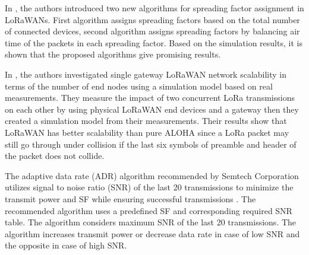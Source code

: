 In \cite{8115779}, the authors introduced two new algorithms for spreading factor assignment in LoRaWANs. First algorithm assigns spreading factors based on the total number of connected devices, second algorithm assigns spreading factors by balancing air time of the packets in each spreading factor. Based on the simulation results, it is shown that the proposed algorithms give promising results.

In \cite{s17061193}, the authors investigated single gateway LoRaWAN network scalability in terms of the number of end nodes using a simulation model based on real measurements. They measure the impact of two concurrent LoRa transmissions on each other by using physical LoRaWAN end devices and a gateway then they created a simulation model from their measurements. Their results show that LoRaWAN has better scalability than pure ALOHA since a LoRa packet may still go through under collision if the last six symbols of preamble and header of the packet does not collide.

The adaptive data rate (ADR) algorithm recommended by Semtech Corporation utilizes signal to noise ratio (SNR) of the last 20 transmissions to minimize the transmit power and SF while ensuring successful transmissions \cite{lorawan_adr}. The recommended algorithm uses a predefined SF and corresponding required SNR table. The algorithm considers maximum SNR of the last 20 transmissions. The algorithm increases transmit power or decrease data rate in case of low SNR and the opposite in case of high SNR.

